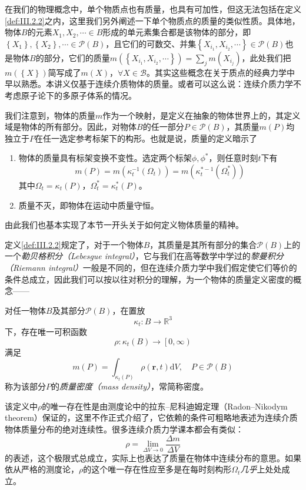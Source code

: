 \documentclass[../main.tex]{subfiles}
\begin{document}
在我们的物理概念中，单个物质点也有质量，也具有可加性，但这无法包括在定义\ref{def:III.2.2}之内，这里我们另外阐述一下单个物质点的质量的类似性质。具体地，物体$B$的元素$X_1,X_2,\cdots\in B$形成的单元素集合都是该物体的部分，即$\left\{X_1\right\},\left\{X_2\right\},\cdots\in\mathcal{P}\left(B\right)$，且它们的可数交、并集$\left\{X_{i_1},X_{i_2},\cdots\right\}\in\mathcal{P}\left(B\right)$也是物体$B$的部分，它们的质量$m\left(\left\{X_{i_1},X_{i_2},\cdots\right\}\right)=\sum_j m\left(X_{i_j}\right)$，此处我们把$m\left(\left\{X\right\}\right)$简写成了$m\left(X\right)$，$\forall X\in\mathcal{B}$。其实这些概念在关于质点的经典力学中早以熟悉。本讲义仅基于连续介质物体的质量。或者可以这么说：连续介质力学不考虑原子论下的多原子体系的情况。

我们注意到，物体的质量$m$作为一个映射，是定义在抽象的物体世界上的，其定义域是物体的所有部分。因此，对物体$B$的任一部分$P\in\mathcal{P}\left(B\right)$，其质量$m\left(P\right)$均独立于$P$在任一选定参考标架下的构形。也就是说，质量的定义暗示了
\begin{enumerate}
    \item 物体的质量具有标架变换不变性。选定两个标架$\phi,\phi^*$，则任意时刻$t$下有
          \[m\left(P\right)=m\left(\kappa_t^{-1}\left(\Omega_t\right)\right)=m\left(\kappa_t^{*-1}\left(\Omega_t^*\right)\right)\]
          其中$\Omega_t=\kappa_t\left(P\right)$，$\Omega_t^*=\kappa_t^*\left(P\right)$。
    \item 质量不灭，即物体在运动中质量守恒。
\end{enumerate}
由此我们也基本实现了本节一开头关于如何定义物体质量的精神。

定义\ref{def:III.2.2}规定了，对于一个物体$B$，其质量是其所有部分的集合$\mathcal{P}\left(B\right)$上的一个\emph{勒贝格积分（Lebesgue integral）}，它与我们在高等数学中学过的\emph{黎曼积分（Riemann integral）}一般是不同的，但在连续介质力学中我们假定使它们等价的条件总成立，因此我们可以按以往对积分的理解，为一个物体的质量定义密度的概念——

\begin{definition}[连续介质物体的质量密度]
    对任一物体$B$及其部分$\mathcal{P}\left(B\right)$，在置放
    \[\kappa_t:B\rightarrow\mathbb{R}^3\]下，存在唯一可积函数
    \[\rho:\kappa_t\left(B\right)\rightarrow\left[0,\infty\right)\]
    满足
    \[m\left(P\right)=\int_{\kappa_t\left(P\right)}\rho\left(\mathbf{r},t\right)\mathrm{d}V,\quad P\in\mathcal{P}\left(B\right)\]
    称为该部分$P$的\emph{质量密度（mass density）}，常简称密度。
\end{definition}
该定义中$\rho$的唯一存在性是由测度论中的拉东--尼科迪姆定理（Radon--Nikodym theorem）保证的，这里不作正式介绍了，它依赖的条件可粗略地表述为连续介质物体质量分布的绝对连续性。很多连续介质力学课本都会有类似：
\[\rho=\lim_{\Delta V\to 0}\frac{\Delta m}{\Delta V}\]
的表述，这个极限式总成立，实际上也表达了质量在物体中连续分布的意思。如果依从严格的测度论，$\rho$的这个唯一存在性应至多是在每时刻构形$\Omega_t$\emph{几乎}上处处成立。
\end{document}
